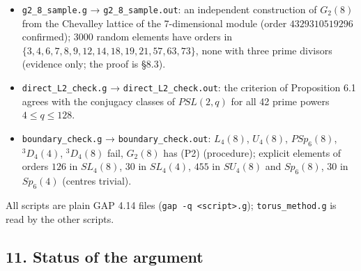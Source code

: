 \documentclass[11pt,a4paper]{article}
\begin{document}
\begin{itemize}
  conjugacy classes of the actual groups \(L_4(3)\), \(L_5(2)\),
  \(U_4(3)\), \(U_5(2)\), \(PSp_4(4)\), \(PSp_6(2)\), \(PSp_4(8)\),
  \(P\Omega_8^+(2)\) (permutation action on projective points) give the
  same element orders, all with \(\omega\le2\).
  \texttt{direct\_classes\_check2.g} →
  \texttt{direct\_classes\_check2.out} does the same for \(\Omega_7(3)\)
  and \(P\Omega_8^+(3)\) (element orders \(1\)--\(10\), \(12\), \(13\),
  \(14\), \(15\), \(18\), \(20\) in both).
  \texttt{direct\_classes\_check3.g} →
  \texttt{direct\_classes\_check3.out}: \(U_6(2)\) (action of
  \(SU_6(2)\) on the 693 isotropic points; element orders
  \(1\)--\(12,15,18\)).
\item
  \texttt{g2\_8\_sample.g} → \texttt{g2\_8\_sample.out}: an independent
  construction of \(G_2(8)\) from the Chevalley lattice of the
  7-dimensional module (order \(4329310519296\) confirmed); 3000 random
  elements have orders in \(\{3,4,6,7,8,9,12,14,18,19,21,57,63,73\}\),
  none with three prime divisors (evidence only; the proof is §8.3).
\item
  \texttt{direct\_L2\_check.g} → \texttt{direct\_L2\_check.out}: the
  criterion of Proposition 6.1 agrees with the conjugacy classes of
  \(PSL(2,q)\) for all 42 prime powers \(4\le q\le128\).
\item
  \texttt{boundary\_check.g} → \texttt{boundary\_check.out}: \(L_4(8)\),
  \(U_4(8)\), \(PSp_6(8)\), \({}^3D_4(4)\), \({}^3D_4(8)\) fail,
  \(G_2(8)\) has (P2) (procedure); explicit elements of orders \(126\)
  in \(SL_4(8)\), \(30\) in \(SL_4(4)\), \(455\) in \(SU_4(8)\) and
  \(Sp_6(8)\), \(30\) in \(Sp_6(4)\) (centres trivial).
\end{itemize}

All scripts are plain GAP 4.14 files
(\texttt{gap\ -q\ \textless{}script\textgreater{}.g});
\texttt{torus\_method.g} is read by the other scripts.

\subsection{11. Status of the argument}\label{status-of-the-argument}
\end{document}
